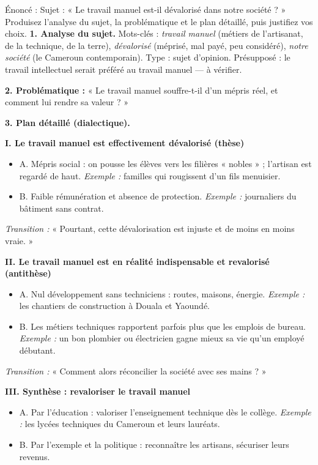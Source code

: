 \documentclass[11pt]{article}
\begin{document}
\begin{exoresolu}
Énoncé : Sujet : « Le travail manuel est-il dévalorisé dans notre société ? » Produisez l'analyse du sujet, la problématique et le plan détaillé, puis justifiez vos choix.
\tcblower
\textbf{1. Analyse du sujet.} Mots-clés : \emph{travail manuel} (métiers de l'artisanat, de la technique, de la terre), \emph{dévalorisé} (méprisé, mal payé, peu considéré), \emph{notre société} (le Cameroun contemporain). Type : sujet d'opinion. Présupposé : le travail intellectuel serait préféré au travail manuel — à vérifier.

\textbf{2. Problématique :} « Le travail manuel souffre-t-il d'un mépris réel, et comment lui rendre sa valeur ? »

\textbf{3. Plan détaillé (dialectique).}

\textbf{I. Le travail manuel est effectivement dévalorisé (thèse)}
\begin{itemize}
\item A. Mépris social : on pousse les élèves vers les filières « nobles » ; l'artisan est regardé de haut. \emph{Exemple :} familles qui rougissent d'un fils menuisier.
\item B. Faible rémunération et absence de protection. \emph{Exemple :} journaliers du bâtiment sans contrat.
\end{itemize}
\emph{Transition :} « Pourtant, cette dévalorisation est injuste et de moins en moins vraie. »

\textbf{II. Le travail manuel est en réalité indispensable et revalorisé (antithèse)}
\begin{itemize}
\item A. Nul développement sans techniciens : routes, maisons, énergie. \emph{Exemple :} les chantiers de construction à Douala et Yaoundé.
\item B. Les métiers techniques rapportent parfois plus que les emplois de bureau. \emph{Exemple :} un bon plombier ou électricien gagne mieux sa vie qu'un employé débutant.
\end{itemize}
\emph{Transition :} « Comment alors réconcilier la société avec ses mains ? »

\textbf{III. Synthèse : revaloriser le travail manuel}
\begin{itemize}
\item A. Par l'éducation : valoriser l'enseignement technique dès le collège. \emph{Exemple :} les lycées techniques du Cameroun et leurs lauréats.
\item B. Par l'exemple et la politique : reconnaître les artisans, sécuriser leurs revenus.
\end{itemize}


\end{exoresolu}
\end{document}
